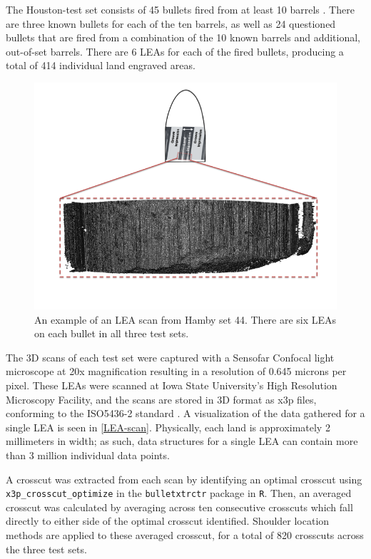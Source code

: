 \documentclass[12pt]{article}
\begin{document}
The Houston-test set consists of 45 bullets fired from at least 10
barrels . There are three
known bullets for each of the ten barrels, as well as 24 questioned
bullets that are fired from a combination of the 10 known barrels and
additional, out-of-set barrels. There are 6 LEAs for each of the fired
bullets, producing a total of 414 individual land engraved areas.

\begin{figure}
\includegraphics[width=\textwidth]{../images/3d_plot_top_context_breakoff.png}
\caption{An example of an LEA scan from Hamby set 44. There are six LEAs on each bullet in all three test sets.}
\label{LEA-scan}
\end{figure}

The 3D scans of each test set were captured with a Sensofar Confocal
light microscope at 20x magnification resulting in a resolution of 0.645
microns per pixel. These LEAs were scanned at Iowa State University's
High Resolution Microscopy Facility, and the scans are stored in 3D
format as x3p files, conforming to the ISO5436-2 standard
\citep{ISO5436}. A visualization of the data gathered for a single LEA
is seen in \autoref{LEA-scan}. Physically, each land is approximately 2
millimeters in width; as such, data structures for a single LEA can
contain more than 3 million individual data points.

A crosscut was extracted from each scan by identifying an optimal
crosscut using \texttt{x3p\_crosscut\_optimize} in the
\texttt{bulletxtrctr} package in \texttt{R}. Then, an averaged crosscut
was calculated by averaging across ten consecutive crosscuts which fall
directly to either side of the optimal crosscut identified. Shoulder
location methods are applied to these averaged crosscut, for a total of
820 crosscuts across the three test sets.
\end{document}
